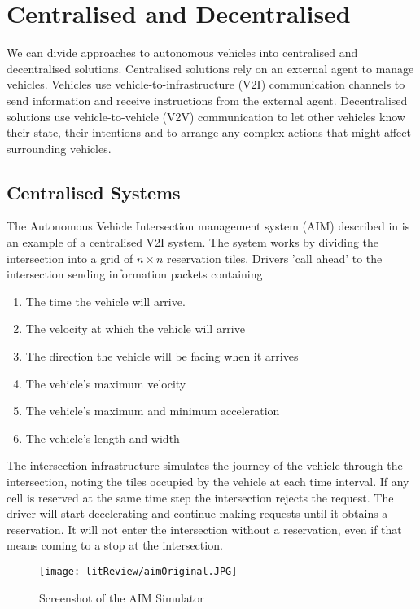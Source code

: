 \section{Centralised and Decentralised}
\label{sec:Centralised and Decentralised}

We can divide approaches to autonomous vehicles into centralised and decentralised solutions. Centralised solutions rely on an external agent to manage vehicles. Vehicles use vehicle-to-infrastructure (V2I) communication channels to send information and receive instructions from the external agent. Decentralised solutions use vehicle-to-vehicle (V2V) communication to let other vehicles know their state, their intentions and to arrange any complex actions that might affect surrounding vehicles.

\subsection{Centralised Systems}
\label{subsec:Centralised Systems}
The Autonomous Vehicle Intersection management system (AIM) described in \citep{Dresner2004} is an example of a centralised V2I system. The system works by dividing the intersection into a grid of $n \times n$ reservation tiles. Drivers 'call ahead' to the intersection sending information packets containing

\begin{enumerate}
\item The time the vehicle will arrive.
\item The velocity at which the vehicle will arrive
\item The direction the vehicle will be facing when it arrives
\item The vehicle's maximum velocity
\item The vehicle's maximum and minimum acceleration
\item The vehicle's length and width
\end{enumerate}

The intersection infrastructure simulates the journey of the vehicle through the intersection, noting the tiles occupied by the vehicle at each time interval. If any cell is reserved at the same time step the intersection rejects the request. The driver will start decelerating and continue making requests until it obtains a reservation. It will not enter the intersection without a reservation, even if that means coming to a stop at the intersection.

\begin{figure}[htb]
\texttt{[image: litReview/aimOriginal.JPG]}
\caption{Screenshot of the AIM Simulator}
\label{fig:AIMOriginal}
\end{figure}

